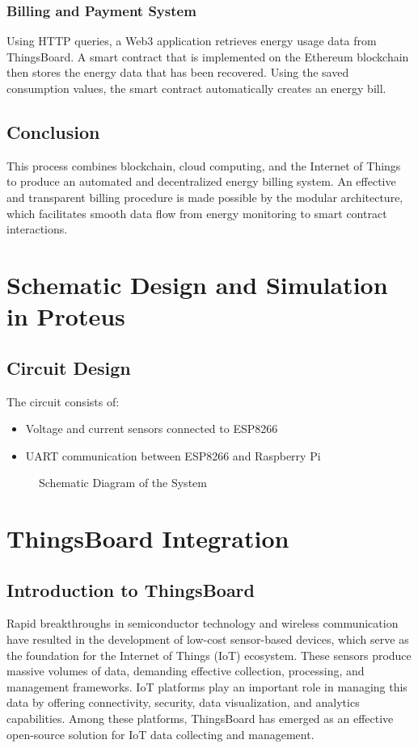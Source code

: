 \documentclass[a4paper,12pt]{report}
\begin{document}
\subsection{Billing and Payment System}

Using HTTP queries, a Web3 application retrieves energy usage data from ThingsBoard.  A smart contract that is implemented on the Ethereum blockchain then stores the energy data that has been recovered.  Using the saved consumption values, the smart contract automatically creates an energy bill.

\section{Conclusion}

This process combines blockchain, cloud computing, and the Internet of Things to produce an automated and decentralized energy billing system.  An effective and transparent billing procedure is made possible by the modular architecture, which facilitates smooth data flow from energy monitoring to smart contract interactions.


\chapter{Schematic Design and Simulation in Proteus}
\section{Circuit Design}
The circuit consists of:
\begin{itemize}
    \item Voltage and current sensors connected to ESP8266
    \item UART communication between ESP8266 and Raspberry Pi
\end{itemize}

\begin{figure}[H]
    \centering

    \caption{Schematic Diagram of the System}
\end{figure}


\chapter{ThingsBoard Integration}
\section{Introduction to ThingsBoard}
Rapid breakthroughs in semiconductor technology and wireless communication have resulted in the development of low-cost sensor-based devices, which serve as the foundation for the Internet of Things (IoT) ecosystem\cite{estrin1999next}.  These sensors produce massive volumes of data, demanding effective collection, processing, and management frameworks.  IoT platforms play an important role in managing this data by offering connectivity, security, data visualization, and analytics capabilities\cite{hammi2018iot}\cite{gazis2015survey}.  Among these platforms, ThingsBoard has emerged as an effective open-source solution for IoT data collecting and management.
\end{document}
